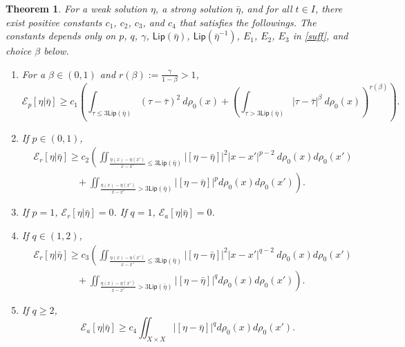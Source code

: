 \documentclass[10pt, letterpaper]{article}
\def\blue{\color{blue}}
\def\E{{\mathcal{E}}}
\def\Lip{{\textsf{Lip}}}
\def\dr{{d\rho_0(x)}}
\newtheorem{theorem}{Theorem}
\theoremstyle{definition}
\theoremstyle{remark}
\begin{document}
\begin{theorem}\label{thm1} For a weak solution $\eta$, a strong solution $\bar\eta$, and for all $t\in I$, there exist positive constants $c_1$, $c_2$, $c_3$, and $c_4$ that satisfies the followings. The constants depends only on $p$, $q$, $\gamma$, $\Lip(\bar\eta)$, $\Lip(\bar\eta^{-1})$, $E_1$, $E_2$, $E_3$ in \eqref{suff}, and choice $\beta$ below.
\begin{enumerate}
 \item For a $\beta \in(0,1)$ and $r(\beta):=\frac{\gamma}{1-\beta}>1$,
 \begin{equation}
 \E_p[\eta|\bar\eta] \ge c_1 \left(\int_{\tau \le 3\Lip(\bar\eta)} (\tau - \bar\tau)^2 \:\dr + \left(\int_{\tau > 3\Lip(\bar\eta)} |\tau - \bar\tau|^\beta \: \dr\right)^{r(\beta)}\right). \label{L} 
 \end{equation}
 \item If $p\in (0,1)$,
 \begin{equation} \label{Lp1}
  \begin{aligned}
   &\E_r[\eta|\bar\eta] \ge c_2 \left(\iint_{\frac{\eta(x)-\eta(x')}{x-x'} \le 3\Lip(\bar\eta)}\big|[\eta - \bar\eta]\big|^2 |x-x'|^{p-2}\:d\rho_0(x)d\rho_0(x')\right. \\
 & ~~\quad \quad \quad\quad+\left.\iint_{\frac{\eta(x)-\eta(x')}{x-x'} > 3\Lip(\bar\eta)}\big|[\eta - \bar\eta]\big|^p d\rho_0(x)d\rho_0(x')\right).
  \end{aligned}
 \end{equation}
 \item {\blue If $p=1$, $\E_r[\eta | \bar\eta] = 0$. If $q=1$, $\E_a[\eta | \bar\eta] = 0$.}
 \item If $q \in (1,2)$,
       \begin{equation} \label{Lq1}
       \begin{aligned}
           &\E_r[\eta|\bar\eta] \ge c_3 \left(\iint_{\frac{\eta(x)-\eta(x')}{x-x'} \le 3\Lip(\bar\eta)}\big|[\eta - \bar\eta]\big|^2 |x-x'|^{q-2}\:d\rho_0(x)d\rho_0(x')\right. \\
           & ~~\quad \quad \quad\quad+\left.\iint_{\frac{\eta(x)-\eta(x')}{x-x'} > 3\Lip(\bar\eta)}\big|[\eta - \bar\eta]\big|^q d\rho_0(x)d\rho_0(x')\right).
       \end{aligned}
       \end{equation}
 \item If $q\ge 2$,
       \begin{equation}
        \E_a[\eta|\bar\eta] \ge c_4 \iint_{X \times X} \big|[\eta - \bar\eta]\big|^q d\rho_0(x)d\rho_0(x'). \label{Lq2}

\end{equation}
\end{enumerate}
\end{theorem}
\end{document}
